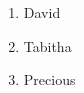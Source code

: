 \documentclass{article}
\begin{document}
	\begin{enumerate}
		\item David
		\item Tabitha
		\item Precious
	\end{enumerate}
\end{document}

